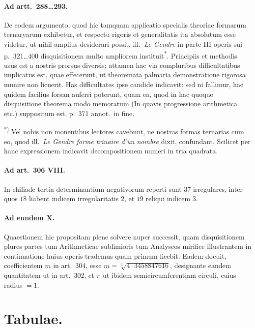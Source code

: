 \documentclass[12pt,a4paper]{article}
\theoremstyle{plain}
\theoremstyle{definition}
\theoremstyle{remark}
\begin{document}
\paragraph{Ad artt.~288\ldots 293.}
De eodem argumento, quod hic tamquam applicatio specialis theoriae
formarum ternaryarum exhibetur, et respectu rigoris et generalitatis ita
absolutum esse videtur, ut nihil amplius desiderari possit, ill.\ \textit{Le Gendre}
in parte III operis sui p.~321\ldots 400 disquisitionem multo ampliorem
instituit\textsuperscript{*}. Principiis et methodis usus est a nostris prorsus diversis;
attamen hac via compluribus difficultatibus implicatus est, quae effecerunt,
ut theoremata palmaria demonstratione rigorosa munire non licuerit. Has
difficultates ipse candide indicavit: sed ni fallimur, hae quidem facilius
forsan auferri poterunt, quam ea, quod in hac quoque disquisitione
theorema modo memoratum (In quavis progressione arithmetica etc.)
suppositum est, p.~371 annot.\ in fine.

\textsuperscript{*)} Vel nobis non monentibus lectores cavebunt, ne nostras formas ternarias
cum eo, quod ill.\ \textit{Le Gendre} \textit{forme trinaire d'un nombre} dixit,
confundant. Scilicet per hanc expressionem indicavit decompositionem numeri
in tria quadrata.

\paragraph{Ad art.~306 VIII.}
In chiliade tertia determinantium negativorum reperti sunt $37$
irregulares, inter quos $18$ habent indicem irregularitatis $2$, et $19$
reliqui indicem $3$.

\paragraph{Ad eundem X.}
Quaestionem hic propositam plene solvere nuper successit, quam
disquisitionem plures partes tum Arithmeticae sublimioris tum Analyseos
mirifice illustrantem in continuatione huius operis trademus quam primum
licebit. Eadem docuit, coefficientem $m$ in art.~304, esse
$m = \sqrt[3]{4\cdot 3458847616}$, designante eandem quantitatem ut in
art.~302, et $\pi$ ut ibidem semicircumferentiam circuli, cuius radius $= 1$.


\newpage
\section*{Tabulae.}
\end{document}
